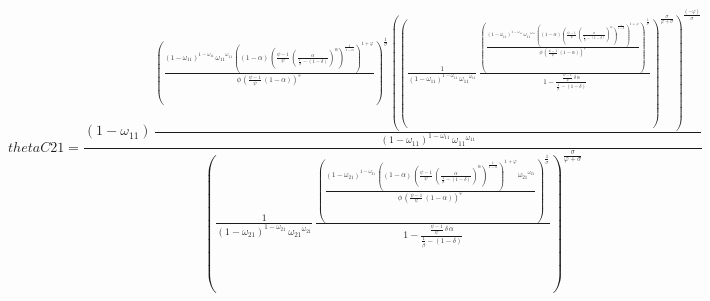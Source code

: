 \begin{dmath*}
thetaC21 = \frac{\left(1-{{\omega_{11}}}\right)\, \frac{\left(\frac{\left(1-{{\omega_{11}}}\right)^{1-{{\omega_{11}}}}\, {{\omega_{11}}}^{{{\omega_{11}}}}\, \left(\left(1-{{\alpha}}\right)\, \left(\frac{{{\psi}}-1}{{{\psi}}}\, \left(\frac{{{\alpha}}}{\frac{1}{{{\beta}}}-\left(1-{{\delta}}\right)}\right)^{{{\alpha}}}\right)^{\frac{1}{1-{{\alpha}}}}\right)^{1+{{\varphi}}}}{{{\phi}}\, \left(\frac{{{\psi}}-1}{{{\psi}}}\, \left(1-{{\alpha}}\right)\right)^{{{\varphi}}}}\right)^{\frac{1}{{{\sigma}}}}\, \left(\left(\frac{1}{\left(1-{{\omega_{11}}}\right)^{1-{{\omega_{11}}}}\, {{\omega_{11}}}^{{{\omega_{11}}}}}\, \frac{\left(\frac{\left(1-{{\omega_{11}}}\right)^{1-{{\omega_{11}}}}\, {{\omega_{11}}}^{{{\omega_{11}}}}\, \left(\left(1-{{\alpha}}\right)\, \left(\frac{{{\psi}}-1}{{{\psi}}}\, \left(\frac{{{\alpha}}}{\frac{1}{{{\beta}}}-\left(1-{{\delta}}\right)}\right)^{{{\alpha}}}\right)^{\frac{1}{1-{{\alpha}}}}\right)^{1+{{\varphi}}}}{{{\phi}}\, \left(\frac{{{\psi}}-1}{{{\psi}}}\, \left(1-{{\alpha}}\right)\right)^{{{\varphi}}}}\right)^{\frac{1}{{{\sigma}}}}}{1-\frac{\frac{{{\psi}}-1}{{{\psi}}}\, {{\delta}}\, {{\alpha}}}{\frac{1}{{{\beta}}}-\left(1-{{\delta}}\right)}}\right)^{\frac{{{\sigma}}}{{{\varphi}}+{{\sigma}}}}\right)^{\frac{\left(-{{\varphi}}\right)}{{{\sigma}}}}}{\left(1-{{\omega_{11}}}\right)^{1-{{\omega_{11}}}}\, {{\omega_{11}}}^{{{\omega_{11}}}}}}{\left(\frac{1}{\left(1-{{\omega_{21}}}\right)^{1-{{\omega_{21}}}}\, {{\omega_{21}}}^{{{\omega_{21}}}}}\, \frac{\left(\frac{\left(1-{{\omega_{21}}}\right)^{1-{{\omega_{21}}}}\, \left(\left(1-{{\alpha}}\right)\, \left(\frac{{{\psi}}-1}{{{\psi}}}\, \left(\frac{{{\alpha}}}{\frac{1}{{{\beta}}}-\left(1-{{\delta}}\right)}\right)^{{{\alpha}}}\right)^{\frac{1}{1-{{\alpha}}}}\right)^{1+{{\varphi}}}\, {{\omega_{21}}}^{{{\omega_{21}}}}}{{{\phi}}\, \left(\frac{{{\psi}}-1}{{{\psi}}}\, \left(1-{{\alpha}}\right)\right)^{{{\varphi}}}}\right)^{\frac{1}{{{\sigma}}}}}{1-\frac{\frac{{{\psi}}-1}{{{\psi}}}\, {{\delta}}\, {{\alpha}}}{\frac{1}{{{\beta}}}-\left(1-{{\delta}}\right)}}\right)^{\frac{{{\sigma}}}{{{\varphi}}+{{\sigma}}}}}
\end{dmath*}
